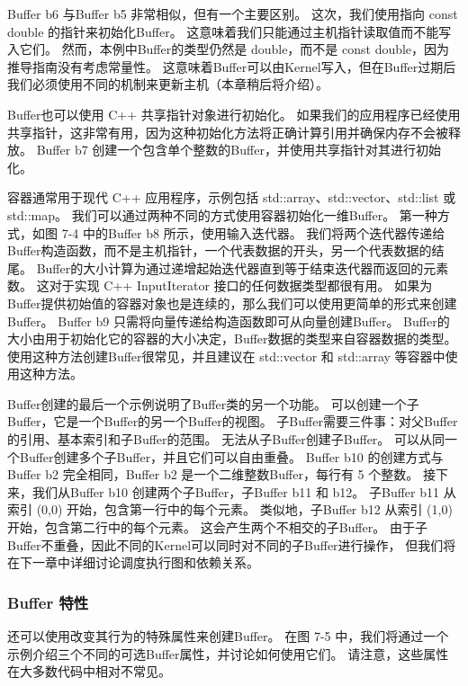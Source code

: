 Buffer b6 与Buffer b5 非常相似，但有一个主要区别。 这次，我们使用指向 const double 的指针来初始化Buffer。 
这意味着我们只能通过主机指针读取值而不能写入它们。 
然而，本例中Buffer的类型仍然是 double，而不是 const double，因为推导指南没有考虑常量性。 
这意味着Buffer可以由Kernel写入，但在Buffer过期后我们必须使用不同的机制来更新主机（本章稍后将介绍）。

Buffer也可以使用 C++ 共享指针对象进行初始化。 
如果我们的应用程序已经使用共享指针，这非常有用，因为这种初始化方法将正确计算引用并确保内存不会被释放。 
Buffer b7 创建一个包含单个整数的Buffer，并使用共享指针对其进行初始化。

容器通常用于现代 C++ 应用程序，示例包括 std::array、std::vector、std::list 或 std::map。 
我们可以通过两种不同的方式使用容器初始化一维Buffer。 第一种方式，如图 7-4 中的Buffer b8 所示，使用输入迭代器。 
我们将两个迭代器传递给Buffer构造函数，而不是主机指针，一个代表数据的开头，另一个代表数据的结尾。 
Buffer的大小计算为通过递增起始迭代器直到等于结束迭代器而返回的元素数。 
这对于实现 C++ InputIterator 接口的任何数据类型都很有用。 
如果为Buffer提供初始值的容器对象也是连续的，那么我们可以使用更简单的形式来创建Buffer。 
Buffer b9 只需将向量传递给构造函数即可从向量创建Buffer。 
Buffer的大小由用于初始化它的容器的大小决定，Buffer数据的类型来自容器数据的类型。 
使用这种方法创建Buffer很常见，并且建议在 std::vector 和 std::array 等容器中使用这种方法。

Buffer创建的最后一个示例说明了Buffer类的另一个功能。 可以创建一个子Buffer，它是一个Buffer的另一个Buffer的视图。
 子Buffer需要三件事：对父Buffer的引用、基本索引和子Buffer的范围。 无法从子Buffer创建子Buffer。 
 可以从同一个Buffer创建多个子Buffer，并且它们可以自由重叠。 
 Buffer b10 的创建方式与Buffer b2 完全相同，Buffer b2 是一个二维整数Buffer，每行有 5 个整数。 
 接下来，我们从Buffer b10 创建两个子Buffer，子Buffer b11 和 b12。 
 子Buffer b11 从索引 (0,0) 开始，包含第一行中的每个元素。 
 类似地，子Buffer b12 从索引 (1,0) 开始，包含第二行中的每个元素。 
 这会产生两个不相交的子Buffer。 由于子Buffer不重叠，因此不同的Kernel可以同时对不同的子Buffer进行操作，
 但我们将在下一章中详细讨论调度执行图和依赖关系。

\subsubsection{Buffer 特性}

还可以使用改变其行为的特殊属性来创建Buffer。 
在图 7-5 中，我们将通过一个示例介绍三个不同的可选Buffer属性，并讨论如何使用它们。 
请注意，这些属性在大多数代码中相对不常见。


